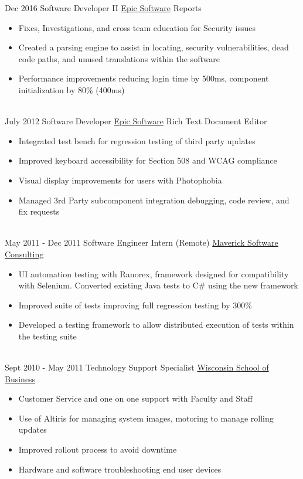 \documentclass[letterpaper]{twentysecondcv} %
\begin{document}
\begin{twenty}
\twentyitem
{Dec 2016}
{}
{Software Developer II}
{\href{https://www.epic.com/}{Epic Software}}
{Reports}
{\begin{itemize}
	\item Fixes, Investigations, and cross team education for Security issues
	\item Created a parsing engine to assist in locating, security vulnerabilities, dead code paths, and unused translations within the software
	\item Performance improvements reducing login time by 500ms, component initialization by 80\% (400ms) 
\end{itemize}}
\\
\twentyitem
{July 2012}
{}
{Software Developer}
{\href{https://www.epic.com/}{Epic Software}}
{Rich Text Document Editor}
{\begin{itemize}
	\item Integrated test bench for regression testing of third party updates
	\item Improved keyboard accessibility for Section 508 and WCAG compliance
	\item Visual display improvements for users with Photophobia
	\item Managed 3rd Party subcomponent integration debugging, code review, and fix requests

\end{itemize}}
\\
\twentyitem
{May 2011 -}
{Dec 2011}
{Software Engineer Intern (Remote)}
{\href{http://www.mavericksoftware.com/}{Maverick Software Consulting}}
{}
{
{\begin{itemize}
	\item UI automation testing with Ranorex, framework designed for compatibility with Selenium. Converted existing Java tests to C\# using the new framework
	\item Improved suite of tests improving full regression testing by 300\%        
	\item Developed a testing framework to allow distributed execution of tests within the testing suite        
\end{itemize}}
}
\\   
\twentyitem
{Sept 2010 -}
{May 2011}
{Technology Support Specialist}
{\href{https://wsb.wisc.edu/}{Wisconsin School of Business}}
{}
{
{\begin{itemize}
	\item Customer Service and one on one support with Faculty and Staff
	\item Use of Altiris for managing system images, motoring to manage rolling updates
	\item Improved rollout process to avoid downtime
		\item Hardware and software troubleshooting end user devices
\end{itemize}}
}
\end{twenty}
\end{document}
